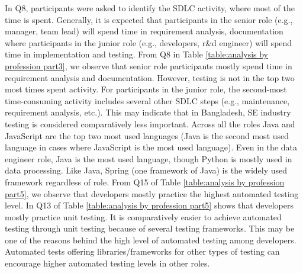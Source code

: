 In Q8, participants were asked to identify the SDLC activity, where most of the time is spent. Generally, it is expected that participants in the senior role (e.g., manager, team lead) will spend time in requirement analysis, documentation where participants in the junior role (e.g., developers, r\&d engineer) will spend time in implementation and testing. From Q8 in Table \ref{table:analysis by profession part3}, we observe that senior role participants mostly spend time in requirement analysis and documentation. However, testing is not in the top two most times spent activity. For participants in the junior role, the second-most time-consuming activity includes several other SDLC steps (e.g., maintenance, requirement analysis, etc.). This may indicate that in Bangladesh, SE industry testing is considered comparatively less important.
Across all the roles Java and JavaScript are the top two most used languages (Java is the second most used language in cases where JavaScript is the most used language). Even in the data engineer role, Java is the most used language, though Python is mostly used in data processing. Like Java, Spring (one framework of Java) is the widely used framework regardless of role.
From Q15 of Table \ref{table:analysis by profession part5}, we observe that developers mostly practice the highest automated testing level. In Q13 of Table \ref{table:analysis by profession part5} shows that developers mostly practice unit testing. It is comparatively easier to achieve automated testing through unit testing because of several testing frameworks. This may be one of the reasons behind the high level of automated testing among developers. Automated tests offering libraries/frameworks for other types of testing can encourage higher automated testing levels in other roles.
